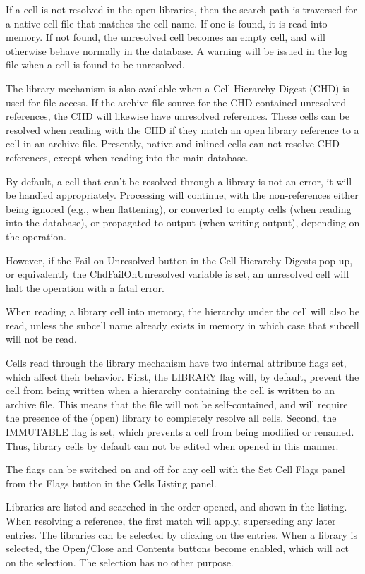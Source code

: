 If a cell is not resolved in the open libraries, then the search path
is traversed for a native cell file that matches the cell name.  If
one is found, it is read into memory.  If not found, the unresolved
cell becomes an empty cell, and will otherwise behave normally in the
database.  A warning will be issued in the log file when a cell is
found to be unresolved.

The library mechanism is also available when a Cell Hierarchy Digest
(CHD) is used for file access.  If the archive file source for the CHD
contained unresolved references, the CHD will likewise have unresolved
references.  These cells can be resolved when reading with the CHD if
they match an open library reference to a cell in an archive file. 
Presently, native and inlined cells can not resolve CHD references,
except when reading into the main database.

By default, a cell that can't be resolved through a library is not an
error, it will be handled appropriately.  Processing will continue,
with the non-references either being ignored (e.g., when flattening),
or converted to empty cells (when reading into the database), or
propagated to output (when writing output), depending on the
operation.

However, if the {\cb Fail on Unresolved} button in the {\cb Cell
Hierarchy Digests} pop-up, or equivalently the {\cb
ChdFailOnUnresolved} variable is set, an unresolved cell will halt the
operation with a fatal error.

When reading a library cell into memory, the hierarchy under the cell
will also be read, unless the subcell name already exists in memory in
which case that subcell will not be read.

Cells read through the library mechanism have two internal attribute
flags set, which affect their behavior.  First, the LIBRARY flag will,
by default, prevent the cell from being written when a hierarchy
containing the cell is written to an archive file.  This means that
the file will not be self-contained, and will require the presence of
the (open) library to completely resolve all cells.  Second, the
IMMUTABLE flag is set, which prevents a cell from being modified or
renamed.  Thus, library cells by default can not be edited when opened
in this manner.

The flags can be switched on and off for any cell with the {\cb Set
Cell Flags} panel from the {\cb Flags} button in the {\cb Cells
Listing} panel.

Libraries are listed and searched in the order opened, and shown in
the listing.  When resolving a reference, the first match will apply,
superseding any later entries.  The libraries can be selected by
clicking on the entries.  When a library is selected, the {\cb
Open/Close} and {\cb Contents} buttons become enabled, which will act
on the selection.  The selection has no other purpose.

